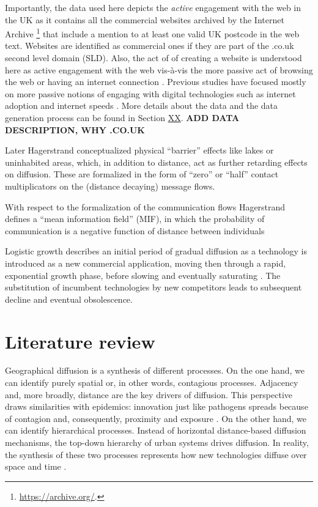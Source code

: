\documentclass[
  authoryear,
  preprint,
  3p]{elsarticle}
\begin{document}
Importantly, the data used here depicts the \emph{active} engagement
with the web in the UK as it contains all the commercial websites
archived by the Internet Archive \footnote{\href{See\%20https://archive.org/}{https://archive.org/}.}
that include a mention to at least one valid UK postcode in the web
text. Websites are identified as commercial ones if they are part of the
.co.uk second level domain (SLD). Also, the act of of creating a website
is understood here as active engagement with the web vis-à-vis the more
passive act of browsing the web or having an internet connection
\citep{tranosuk}. Previous studies have focused mostly on more passive
notions of engaging with digital technologies such as internet adoption
and internet speeds
\citep[e.g.][]{blank2018local, riddlesden2014broadband}. More details
about the data and the data generation process can be found in Section
\protect\hyperlink{sec3}{XX}. \textbf{ADD DATA DESCRIPTION, WHY .CO.UK}

\citet{grubler1990rise} Later Hagerstrand conceptualized physical
``barrier'' effects like lakes or uninhabited areas, which, in addition
to distance, act as further retarding effects on diffusion. These are
formalized in the form of ``zero'' or ``half'' contact multiplicators on
the (distance decaying) message flows.

\citet{grubler1990rise} With respect to the formalization of the
communication flows Hagerstrand defines a ``mean information field''
(MIF), in which the probability of communication is a negative function
of distance between individuals

\citet{wilson201281} Logistic growth describes an initial period of
gradual diffusion as a technology is introduced as a new commercial
application, moving then through a rapid, exponential growth phase,
before slowing and eventually saturating \citep{grubler1999dynamics}.
The substitution of incumbent technologies by new competitors leads to
subsequent decline and eventual obsolescence.

\hypertarget{sec2}{%
\section{Literature review}\label{sec2}}

Geographical diffusion is a synthesis of different processes. On the one
hand, we can identify purely spatial or, in other words, contagious
processes. Adjacency and, more broadly, distance are the key drivers of
diffusion. This perspective draws similarities with epidemics:
innovation just like pathogens spreads because of contagion and,
consequently, proximity and exposure \citep{hivner2003facilitating}. On
the other hand, we can identify hierarchical processes. Instead of
horizontal distance-based diffusion mechanisms, the top-down hierarchy
of urban systems drives diffusion. In reality, the synthesis of these
two processes represents how new technologies diffuse over space and
time \citep{morrill2020spatial}.
\end{document}
